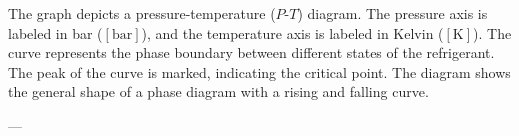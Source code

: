 The graph depicts a pressure-temperature (\(P\)-\(T\)) diagram. The pressure axis is labeled in bar (\([ \text{bar} ]\)), and the temperature axis is labeled in Kelvin (\([ \text{K} ]\)). The curve represents the phase boundary between different states of the refrigerant. The peak of the curve is marked, indicating the critical point. The diagram shows the general shape of a phase diagram with a rising and falling curve.

---